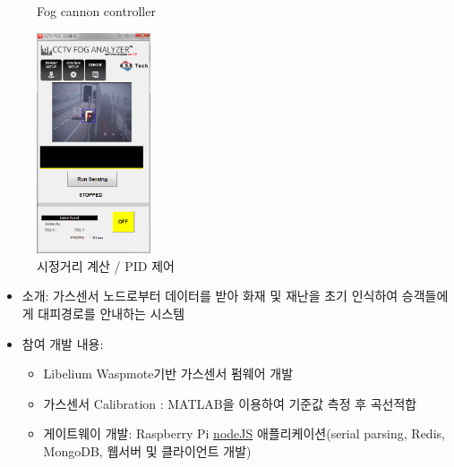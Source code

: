 \documentclass[10pt,a4paper,ragged2e]{altacv}
\begin{document}
\begin{fullwidth}
\begin{itemize}
\begin{figure}[!ht]
\begin{fullwidth}
{					      \caption*{Fog cannon controller}
				      }\qquad
				      \parbox{0.3\textwidth}{
					      \includegraphics[width=0.3\textwidth]{images/fog_03.png}
					      \caption*{시정거리 계산 / PID 제어}
				      }
			      \end{fullwidth}
		      \end{figure}
	\end{itemize}

	\divider


	\begin{itemize}
		\item
		      소개: 가스센서 노드로부터 데이터를 받아 화재 및 재난을 초기 인식하여 승객들에게 대피경로를 안내하는 시스템
		\item
		      참여 개발 내용:
		      \begin{itemize}
			      \item Libelium Waspmote기반 가스센서 펌웨어 개발
			      \item 가스센서 Calibration : MATLAB을 이용하여 기준값 측정 후 곡선적합
			      \item 게이트웨이 개발: Raspberry Pi \href{https://nodejs.org}{nodeJS} 애플리케이션(serial parsing, Redis, MongoDB, 웹서버 및 클라이언트 개발)


\end{itemize}
\end{itemize}
\end{fullwidth}
\end{document}
